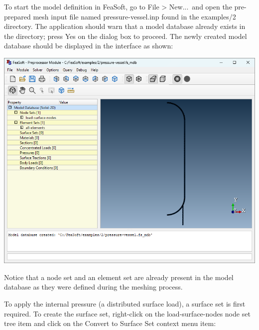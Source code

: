 \documentclass[
    11pt,        %
    a4paper,     %
    final,       %
    fleqn,       %
    notitlepage, %
    onecolumn,   %
    oneside,     %
]{article}
\begin{document}
To start the model definition in FeaSoft, go to File > New...\ and open the pre-prepared mesh input file named pressure-vessel.inp found in the examples/2 directory. The application should warn that a model database already exists in the directory; press Yes on the dialog box to proceed. The newly created model database should be displayed in the interface as shown:
\begin{center}
    \includegraphics[scale=0.5]{fig/ui-2-1.png}
\end{center}
Notice that a node set and an element set are already present in the model database as they were defined during the meshing process.

To apply the internal pressure (a distributed surface load), a surface set is first required. To create the surface set, right-click on the load-surface-nodes node set tree item and click on the Convert to Surface Set context menu item:
\begin{center}
\end{center}
\end{document}
